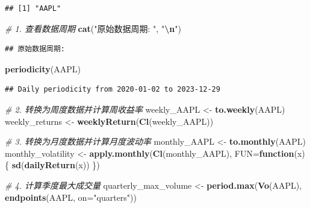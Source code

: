 \documentclass[]{ctexbook}
\newenvironment{Shaded}{\begin{snugshade}}{\end{snugshade}}
\newcommand{\AttributeTok}[1]{\textcolor[rgb]{0.13,0.29,0.53}{#1}}
\newcommand{\CommentTok}[1]{\textcolor[rgb]{0.56,0.35,0.01}{\textit{#1}}}
\newcommand{\ControlFlowTok}[1]{\textcolor[rgb]{0.13,0.29,0.53}{\textbf{#1}}}
\newcommand{\FunctionTok}[1]{\textcolor[rgb]{0.13,0.29,0.53}{\textbf{#1}}}
\newcommand{\NormalTok}[1]{#1}
\newcommand{\OtherTok}[1]{\textcolor[rgb]{0.56,0.35,0.01}{#1}}
\newcommand{\SpecialCharTok}[1]{\textcolor[rgb]{0.81,0.36,0.00}{\textbf{#1}}}
\newcommand{\StringTok}[1]{\textcolor[rgb]{0.31,0.60,0.02}{#1}}
\begin{document}
\begin{verbatim}
## [1] "AAPL"
\end{verbatim}

\begin{Shaded}
\begin{Highlighting}[]
\CommentTok{\# 1. 查看数据周期}
\FunctionTok{cat}\NormalTok{(}\StringTok{"原始数据周期: "}\NormalTok{, }\StringTok{"}\SpecialCharTok{\textbackslash{}n}\StringTok{"}\NormalTok{)}
\end{Highlighting}
\end{Shaded}

\begin{verbatim}
## 原始数据周期:
\end{verbatim}

\begin{Shaded}
\begin{Highlighting}[]
\FunctionTok{periodicity}\NormalTok{(AAPL)}
\end{Highlighting}
\end{Shaded}

\begin{verbatim}
## Daily periodicity from 2020-01-02 to 2023-12-29
\end{verbatim}

\begin{Shaded}
\begin{Highlighting}[]
\CommentTok{\# 2. 转换为周度数据并计算周收益率}
\NormalTok{weekly\_AAPL }\OtherTok{\textless{}{-}} \FunctionTok{to.weekly}\NormalTok{(AAPL)}
\NormalTok{weekly\_returns }\OtherTok{\textless{}{-}} \FunctionTok{weeklyReturn}\NormalTok{(}\FunctionTok{Cl}\NormalTok{(weekly\_AAPL))}

\CommentTok{\# 3. 转换为月度数据并计算月度波动率}
\NormalTok{monthly\_AAPL }\OtherTok{\textless{}{-}} \FunctionTok{to.monthly}\NormalTok{(AAPL)}
\NormalTok{monthly\_volatility }\OtherTok{\textless{}{-}} \FunctionTok{apply.monthly}\NormalTok{(}\FunctionTok{Cl}\NormalTok{(monthly\_AAPL), }
                                   \AttributeTok{FUN=}\ControlFlowTok{function}\NormalTok{(x) \{ }\FunctionTok{sd}\NormalTok{(}\FunctionTok{dailyReturn}\NormalTok{(x)) \})}

\CommentTok{\# 4. 计算季度最大成交量}
\NormalTok{quarterly\_max\_volume }\OtherTok{\textless{}{-}} \FunctionTok{period.max}\NormalTok{(}\FunctionTok{Vo}\NormalTok{(AAPL), }\FunctionTok{endpoints}\NormalTok{(AAPL, }\AttributeTok{on=}\StringTok{"quarters"}\NormalTok{))}
\end{Highlighting}
\end{Shaded}
\end{document}
